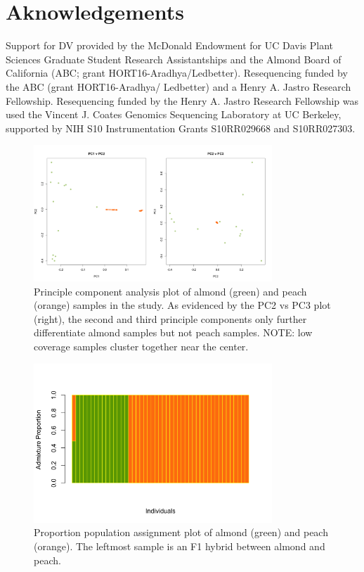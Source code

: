 \documentclass[12pt]{article}
\newcommand{\beginsupplement}{%
        \setcounter{table}{0}
        \renewcommand{\thetable}{S\arabic{table}}%
        \setcounter{figure}{0}
        \renewcommand{\thefigure}{S\arabic{figure}}%
     }
\begin{document}
\section*{Aknowledgements}
Support for DV provided by the McDonald Endowment for UC Davis Plant Sciences Graduate Student Research Assistantships and the Almond Board of California (ABC; grant HORT16-Aradhya/Ledbetter). 
%
Resequencing funded by the ABC (grant HORT16-Aradhya/ Ledbetter) and a Henry A. Jastro Research Fellowship. 
%
Resequencing funded by the Henry A. Jastro Research Fellowship was used the Vincent J. Coates Genomics Sequencing Laboratory at UC Berkeley, supported by NIH S10 Instrumentation Grants S10RR029668 and S10RR027303.
%
\pagebreak

%
%
\pagebreak
\begin{figure}[b]
\centering
   \includegraphics[width=0.8\textwidth]{pca.png}
  \caption{Principle component analysis plot of almond (green) and peach (orange) samples in the study. As evidenced by the PC2 vs PC3 plot (right), the second and third principle components only further differentiate almond samples but not peach samples. NOTE: low coverage samples cluster together near the center.}
  \label{fig:pca}
\end{figure}
%
\begin{figure}[b]
\centering
   \includegraphics[width=0.8\textwidth]{Admixture_test.png}
  \caption{Proportion population assignment plot of almond (green) and peach (orange). The leftmost sample is an F1 hybrid between almond and peach.}
  \label{fig:admix}
\end{figure}
%
\pagebreak
%
%
\beginsupplement
\end{document}
